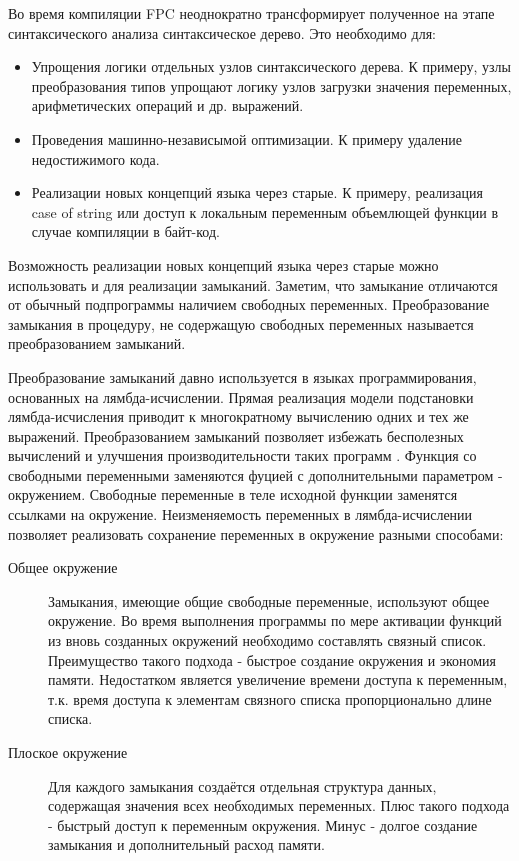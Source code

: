 \documentclass{imcs}
\begin{document}
Во время компиляции FPC неоднократно трансформирует полученное на этапе синтаксического 
анализа синтаксическое дерево. Это необходимо для:
\begin{itemize}
    \item Упрощения логики отдельных узлов синтаксического дерева. К 
примеру, узлы преобразования типов упрощают логику узлов загрузки значения переменных,
арифметических операций и др. выражений.
    \item Проведения машинно-независымой оптимизации. К примеру удаление недостижимого
кода.
    \item Реализации новых концепций языка через старые. К примеру, реализация
case of string\cite{misha} или доступ к локальным переменным объемлющей функции в
случае компиляции в байт-код.
\end{itemize}      

Возможность реализации новых концепций языка через старые можно использовать и
для реализации замыканий. Заметим, что замыкание отличаются от 
обычный подпрограммы наличием свободных переменных. Преобразование
замыкания в процедуру, не содержащую свободных переменных называется преобразованием
замыканий\cite{moderncompiler}.

Преобразование замыканий давно используется в языках программирования, основанных на
лямбда-исчислении. Прямая реализация модели подстановки
лямбда-исчисления приводит к многократному вычислению одних и тех же выражений.
Преобразованием замыканий позволяет избежать бесполезных вычислений
и улучшения производительности таких программ \cite{lambdaclosure95}. 
Функция со свободными переменными
заменяются фуцией с дополнительными параметром - окружением. Свободные переменные
в теле исходной функции заменятся ссылками на окружение.  
Неизменяемость переменных в лямбда-исчислении позволяет реализовать сохранение
переменных в окружение разными способами:

\begin{description}
    \item[Общее окружение] Замыкания, имеющие общие свободные переменные,
используют общее окружение. Во время выполнения программы по мере активации функций
из вновь созданных окружений необходимо составлять связный список.
Преимущество такого подхода - быстрое создание окружения и экономия памяти. Недостатком
является увеличение времени доступа к переменным, т.к. время доступа к элементам связного
списка пропорционально длине списка.
    \item[Плоское окружение] Для каждого замыкания создаётся отдельная структура данных,
содержащая значения всех необходимых переменных. Плюс такого подхода - быстрый доступ
к переменным окружения. Минус - долгое создание замыкания и дополнительный расход памяти.
\end{description}
\end{document}
